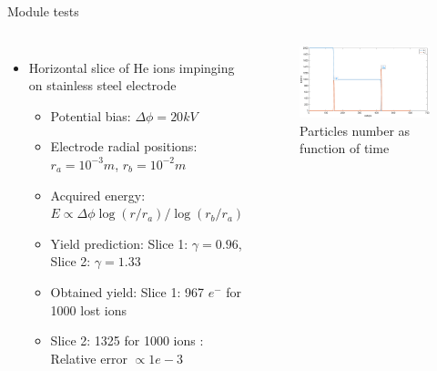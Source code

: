 \documentclass[aspectratio=169,xcolor=dvipsnames,8pt]{beamer}
\begin{document}
  \begin{frame}{Module tests}
     \begin{columns}[c] %

	\begin{itemize}


		\item{Horizontal slice of He ions impinging on stainless steel electrode\\
			\begin{itemize}
		
				\item{Potential bias: $\Delta\phi = 20kV$}
				\item{Electrode radial positions: $r_a = 10^{-3}m$, $r_b = 10^{-2}m$ }
				\item{Acquired energy: $E\propto \Delta \phi \log(r/r_a)/\log(r_b/r_a)$} 
				\item{Yield prediction: Slice 1: $\gamma =0.96$, Slice 2: $\gamma = 1.33$}
				\item{Obtained yield: Slice 1: 967 $e^{-}$ for 1000 lost ions}
				\item{Slice 2: 1325 for 1000 ions : Relative error $\propto 1e-3$}
				\end{itemize}}
				
						
	\end{itemize}

		\begin{figure}[h!]
		\includegraphics[width=1 \textwidth]{flatslice.eps}
		\caption{\label{img1} Particles number as function of time}
		\end{figure}
     \end{columns}
\end{frame}
\end{document}
